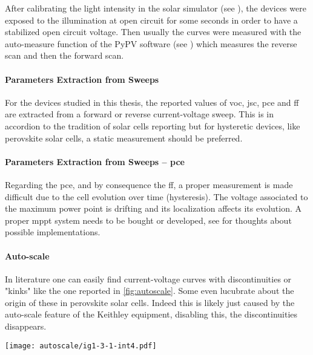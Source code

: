 	After calibrating the light intensity in the solar simulator (see ), the devices were exposed to the illumination at open circuit for some seconds in order to have a stabilized open circuit voltage.
	Then usually the curves were measured with the auto-measure function of the PyPV software (see ) which measures the reverse scan and then the forward scan.

	\paragraph{Parameters Extraction from Sweeps}
	For the devices studied in this thesis, the reported values of \gls{voc}, \gls{jsc}, \gls{pce} and \gls{ff} are extracted from a forward or reverse current-voltage sweep.
	This is in accordion to the tradition of solar cells reporting but for hysteretic devices, like perovskite solar cells, a static measurement should be preferred.

	\paragraph{Parameters Extraction from Sweeps -- \gls{pce}} Regarding the \gls{pce}, and by consequence the \gls{ff}, a proper measurement is made difficult due to the cell evolution over time (hysteresis).
	The voltage associated to the maximum power point is drifting and its localization affects its evolution.
	A proper \gls{mppt} system needs to be bought or developed, see  for thoughts about possible implementations.

	\paragraph{Auto-scale}\label{autoscale} In literature one can easily find current-voltage curves with discontinuities or "kinks" \cite{Li2016,Snaith2014,Zhang2015} like the one reported in \cref{fig:autoscale}.
	Some even lucubrate about the origin of these in perovskite solar cells.
	Indeed this is likely just caused by the auto-scale feature of the Keithley equipment, disabling this, the discontinuities disappears.

	\begin{SCfigure}%
		\centering
		\texttt{[image: autoscale/ig1-3-1-int4.pdf]}
		\label{fig:autoscale}
	\end{SCfigure}

